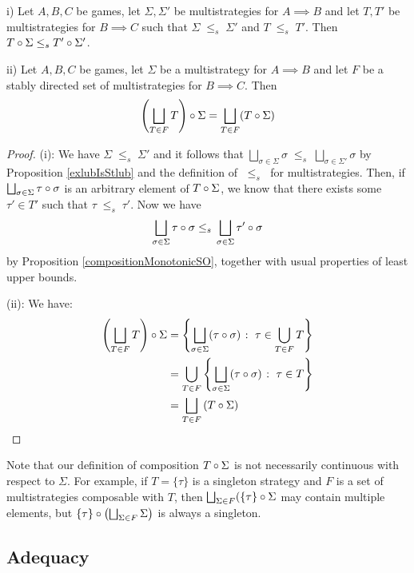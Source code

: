 \documentclass{entcs} \usepackage{prentcsmacro}
\newcommand{\stle}{{\;\le_s\;}}
\newcommand{\exlub}{\bigsqcup}
\newcommand{\0}{{\mathtt{0}}}
\newcommand{\Tau}{T}
\begin{document}
\begin{proposition}
  \label{RareContinuityResult}
  i) Let $A,B,C$ be games, let $\Sigma,\Sigma'$ be multistrategies for $A\implies B$ and let $\Tau,\Tau'$ be multistrategies for $B\implies C$ such that $\Sigma\stle\Sigma'$ and $\Tau\stle\Tau'$.  Then $\icomp\Tau\Sigma\stle\icomp{\Tau'}{\Sigma'}$.  

  ii) Let $A,B,C$ be games, let $\Sigma$ be a multistrategy for $A\implies B$ and let $F$ be a stably directed set of multistrategies for $B\implies C$.  Then
      \[
        \icomp{\left(\exlub_{\Tau\in F}\Tau\right)}\Sigma = \exlub_{\Tau\in F}(\icomp\Tau\Sigma)
        \]
\end{proposition}
\begin{proof}
  (i): We have $\Sigma\stle\Sigma'$ and it follows that $\exlub_{\sigma\in\Sigma}\sigma\stle\exlub_{\sigma\in\Sigma'}\sigma$ by Proposition \ref{exlubIsStlub} and the definition of $\stle$ for multistrategies.  Then, if $\exlub_{\sigma\in\Sigma}\icomp\tau\sigma$ is an arbitrary element of $\icomp\Tau\Sigma$, we know that there exists some $\tau'\in \Tau'$ such that $\tau\stle\tau'$.  Now we have
  \[
    \exlub_{\sigma\in\Sigma}\icomp\tau\sigma\stle\exlub_{\sigma\in\Sigma}\icomp{\tau'}{\sigma}
    \]
  by Proposition \ref{compositionMonotonicSO}, together with usual properties of least upper bounds.

  (ii): We have:
  \begin{align*}
    \icomp{\left(\exlub_{\Tau\in F}\Tau\right)}\Sigma & = \left\{\exlub_{\sigma\in\Sigma}(\icomp\tau\sigma)\suchthat\tau\in\bigcup_{\Tau\in F}\Tau\right\} \\
      & = \bigcup_{\Tau\in F}\left\{\exlub_{\sigma\in \Sigma}(\icomp\tau\sigma)\suchthat\tau\in\Tau\right\} \\
      & = \exlub_{\Tau\in F}\left(\icomp\Tau\Sigma\right)
  \end{align*}
\end{proof}

Note that our definition of composition $\icomp\Tau\Sigma$ is not necessarily continuous with respect to $\Sigma$.  For example, if $\Tau=\{\tau\}$ is a singleton strategy and $F$ is a set of multistrategies composable with $\Tau$, then $\exlub_{\Sigma\in F}(\icomp{\{\tau\}}\Sigma$ may contain multiple elements, but $\icomp{\{\tau\}}{\left(\exlub_{\Sigma\in F}\Sigma\right)}$ is always a singleton.

\subsection{Adequacy}
\end{document}
